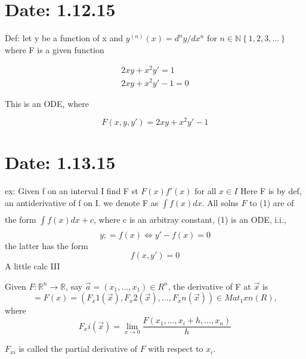 \documentclass[10pt,a4paper]{article}
\begin{document}
\graphicspath{ {./images/} }


\section{Date: 1.12.15}

  Def: let y be a function of x 
  and $ y^{(n)}(x) = d^{n}y/dx^{n}$ for $n \in \mathbb{N} \left\{ 1, 2, 3, ...\right\} $ 
  where F is a given function 

  \begin{gather*}
    2xy + x^{2}y' = 1\\ 
    2xy + x^{2}y'-1 = 0
  \end{gather*}

  This is an ODE, where 

  \begin{equation*}
    F(x,y,y') = 2xy + x^{2}y'-1 
  \end{equation*}

\section{Date: 1.13.15}
  ex: Given f on an interval I find F st 
  $F(x)f'(x)$ for all $x \in I$
  Here F is by def, an antiderivative of f
  on I. we denote F as $\int\limits_{}^{}f(x)dx$.
  All solns $F$ to (1) are of the form $\int\limits_{}^{}f(x)dx+c$, 
  where c is an arbitray constant,
  (1) is an ODE, i.i.,
  \begin{equation*}
    y; = f(x) \iff y'-f(x) = 0
  \end{equation*}
  the latter has the form 
  \begin{equation*}
    f(x,y') = 0 
  \end{equation*}
  A little calc III

  Given $F: \mathbb{R}^n \to \mathbb{R}$, 
  say $\vec{a}=(x_1,...,x_1) \in R^n$, 
  the derivative of F at $\vec{x}$ is 
  $$    =F(x)=(F_x1(\vec{x}), F_x2(\vec{x}),..., F_xn(\vec{x})) \in Mat_1xn(R),$$ where 
  $$    F_xi(\vec{x})=  \lim_{x \to 0} \frac{F(x_1,..., x_i+h,..., x_n)}{h} $$



  $F_{xi}$ is called the partial derivative of $F$
  with respect to $x_i$. 
\end{document}
